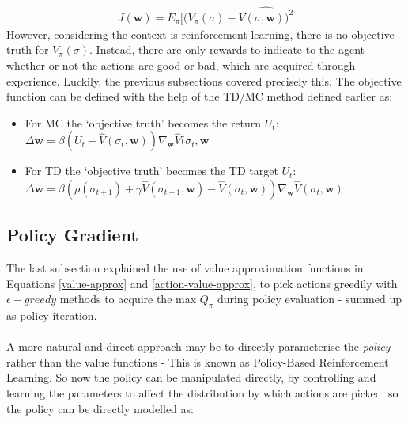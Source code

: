 \documentclass[ %
                    author={Ashwinder Khurana},
                supervisor={Prof Dave Cliff},
                    degree={MEng},
                     title={The Deeply Reinforced Trader},
                  subtitle={},
                      type={enterprise},
                      year={2020} ]{dissertation}
\begin{document}
{\begin{equation}
\label{MSE-supervised}
\begin{split}
J(\textbf{w}) = E_\pi[(V_\pi(\sigma) - \hat{V(\sigma, \textbf{w}))^{2}}
\end{split}
\end{equation}
\noindent
However, considering the context is reinforcement learning, there is no objective truth for $V_\pi(\sigma)$. Instead, there are only rewards to indicate to the agent whether or not the actions are good or bad, which are acquired through experience. 
Luckily, the previous subsections covered precisely this. The objective function can be defined with the help of the TD/MC method defined earlier as:
\begin{itemize}
\item For MC the \enquote*{objective truth} becomes the return $U_t$: $\Delta \textbf{w} = \beta(U_t - \hat{V}(\sigma_t, \textbf{w})) \nabla_\textbf{w} \hat{V}(\sigma_t, \textbf{w}$
\item For TD the \enquote*{objective truth} becomes the TD target $U_t$: $\Delta \textbf{w} = \beta(\rho(\sigma_{t+1}) + \gamma\hat{V}(\sigma_{t+1}, \textbf{w}) - \hat{V}(\sigma_t, \textbf{w})) \nabla_\textbf{w} \hat{V}(\sigma_t, \textbf{w})$
\end{itemize}

\subsection{Policy Gradient}
\label{subsection:Policy Gradient}
The last subsection explained the use of value approximation functions in Equations \ref{value-approx} and \ref{action-value-approx}, to pick actions greedily with $\epsilon-greedy$ methods to acquire the max $Q_\pi$ during policy evaluation - summed up as policy iteration. 
\\
\\
A more natural and direct approach may be to directly parameterise the \textit{policy} rather than the value functions - This is known as Policy-Based Reinforcement Learning. So now the policy can be manipulated directly, by controlling and learning the parameters to affect the distribution by which actions are picked: so the policy can be directly modelled as:

}
\end{document}
